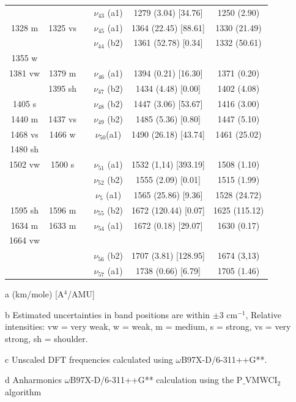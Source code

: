 \begin{table}[H]
\begin{center}
\begin{threeparttable}
\begin{tabular}{c c c c c c}
	\\ 
	&  &  &  $\nu_{43}$ (a1) & 1279 (3.04) [34.76] & 1250 (2.90) \\ 
	1328 m & 1325 vs&  & $\nu_{45}$ (a1)& 1364 (22.45) [88.61] &1330 (21.49) \\ 
		&  &  & $\nu_{44}$ (b2)& 1361 (52.78) [0.34] & 1332 (50.61) \\ 
	1355 w &  &  & \multicolumn{1}{c}{} &  &  \\ 
	1381 vw & 1379 m&  &  $\nu_{46}$ (a1)& 1394 (0.21) [16.30] & 1371 (0.20)	\\ 
	& 1395 sh &  & $\nu_{47}$ (b2) & 1434 (4.48) [0.00] & \multicolumn{1}{c}{ 1402 (4.08)} \\ 
	1405 s &  &  & $\nu_{48}$ (b2) & 1447 (3.06) [53.67] & 1416 (3.00) \\ 
	1440 m & 1437 vs
	&  & \multicolumn{1}{c}{$\nu_{49}$ (b2)} & 1485 (5.36) [0.80] & 1447 (5.10) \\ 
	1468 vs & 1466 w&  & $\nu_{50}$(a1)& 1490 (26.18) [43.74] &  1461 (25.02) \\ 
	1480 sh &  &  &  &  &  \\ 
	1502 vw & 1500 s&  & $\nu_{51}$ (a1)& 1532 (1,14) [393.19] & 1508 (1.10) \\ 
	&  &  &  $\nu_{52}$ (b2) & 1555 (2.09) [0.01] & 1515 (1.99) \\ 
	& \multicolumn{1}{l}{} &  & $\nu_{5}$ (a1)
	& 1565 (25.86) [9.36] &   1528 (24.72) \\ 
	1595 sh & 1596 m&  & $\nu_{55}$ (b2) & 	1672 (120.44) [0.07] &	1625 (115.12) \\ 
	1634 m & 1633 m	&  & $\nu_{54}$ (a1)	& 1672 (0.18) [29.07] & 1630 (0.17)	\\ 
	1664 vw & \multicolumn{1}{l}{} &  &  &  &  \\
	&  &  & $\nu_{56}$ (b2) & 1707 (3.81) [128.95] & 1674 (3,13) \\ 
	&  &  &$\nu_{57}$ (a1)& 1738 (0.66) [6.79] & 1705 (1.46) \\
			\bottomrule
		
	\end{tabular}
	
	\begin{tablenotes}
		\item[a] (km/mole) [A$^{4}$/AMU]
		\item[b] Estimated uncertainties in band positions are within $\pm$3 cm$^{-1}$, Relative intensities: vw = very weak, w = weak, m = medium, s = strong, vs = very strong, sh = shoulder.
		\item[c] Unscaled DFT frequencies calculated using $\omega$B97X-D/6-311++G**.
		\item[d] Anharmonics $\omega$B97X-D/6-311++G** calculation using the P$\_$VMWCI$_{2}$ algorithm
	\end{tablenotes}
\end{threeparttable}
\end{center}
\label{freq-45-imino}
\end{table}
	
